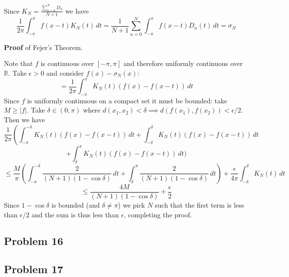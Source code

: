 \documentclass{amsart}
\begin{document}
\medskip \noindent Since $K_N=\frac{\sum_{n=0}^ND_n}{N+1}$ we have \[\frac{1}{2\pi}\int_{-\pi}^\pi f(x-t)K_N(t)\, dt=\frac{1}{N+1}\sum_{n=0}^N\int_{-\pi}^\pi f(x-t)D_n(t)\,dt = \sigma_N\]

\medskip \noindent \textbf{Proof} of Fejer's Theorem.

\medskip \noindent Note that $f$ is continuous over $[-\pi, \pi]$ and therefore uniformly continuous over $\mathbb{R}$. Take $\epsilon>0$ and consider $f(x)-\sigma_N(x)$:
\[=\frac{1}{2\pi}\int_{-\pi}^\pi K_N(t)(f(x)-f(x-t))\,dt\]
Since $f$ is uniformly continuous on a compact set it must be bounded: take $M\geq |f|$. Take $\delta\in (0,\pi)$ where $d(x_1, x_2)<\delta\implies d(f(x_1),f(x_2))<\epsilon/2$. Then we have
\[\frac{1}{2\pi}\left(\int_{-\pi}^{-\delta} K_N(t)(f(x)-f(x-t))\,dt + \int_{-\delta}^\delta K_N(t)(f(x)-f(x-t))\,dt\]\[+\int_\delta^\pi K_N(t)(f(x)-f(x-t))\,dt\Bigg)\]
\[\leq \frac{M}{\pi}\left(\int_{-\pi}^{-\delta}\frac{2}{(N+1)(1-\cos\delta)}\,dt+\int_{\delta}^{\pi}\frac{2}{(N+1)(1-\cos\delta)}\,dt\right)+\frac{\epsilon}{4\pi}\int_{-\delta}^\delta K_N(t)\,dt\]
\[\leq \frac{4M}{(N+1)(1-\cos\delta)}+\frac{\epsilon}{2}\]
Since $1-\cos\delta$ is bounded (and $\delta\neq \pi$) we pick $N$ such that the first term is less than $\epsilon/2$ and the sum is thus less than $\epsilon$, completing the proof.
	



\subsection*{Problem 16}

\subsection*{Problem 17}
\end{document}
